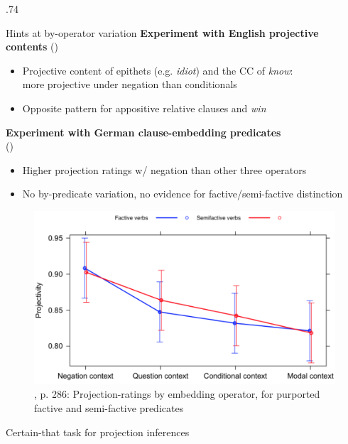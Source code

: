 \documentclass[final]{beamer}
\newlength{\colwidth}
\newlength{\vboxsep}
\begin{document}
\begin{frame}[t]
\begin{columns}[t]
\begin{column}{.74\colwidth}
\begin{normalbox}{Hints at by-operator variation}
				\textbf{Experiment with English projective contents} (\citealt{smith_relationship_2014})
				\vspace{-.2\baselineskip}
				\begin{itemize}
					\item Projective content of epithets (e.g. \textit{idiot}) and the CC of \textit{know}:\\ more projective under negation than conditionals
					\item Opposite pattern for appositive relative clauses and \textit{win}
				\end{itemize}

				\textbf{Experiment with German clause-embedding predicates}\\ (\citealt{sieker_projective_2022})
				\vspace{-.2\baselineskip}
				\begin{itemize}
					\item Higher projection ratings w/ negation than other three operators
					\item No by-predicate variation, no evidence for factive/semi-factive distinction
				\end{itemize}

				\begin{figure}[h]
					\vspace{-.2\baselineskip}
					\centering
					\includegraphics[width=.7\linewidth]{sieker-solstad.png}
					\vspace{-.4\baselineskip}
					\caption{\citealt{sieker_projective_2022}, p. 286: Projection-ratings by embedding operator, for purported factive and semi-factive predicates}
				\end{figure}
				\vspace{-.8\baselineskip}
			\end{normalbox}

			\vspace{\vboxsep}
			\begin{normalbox}{Certain-that task for projection inferences}


\end{normalbox}
\end{column}
\end{columns}
\end{frame}
\end{document}
